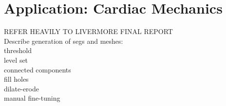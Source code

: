 \chapter{Application: Cardiac Mechanics}
\label{chap:5}
%

REFER HEAVILY TO LIVERMORE FINAL REPORT \\
Describe generation of segs and meshes: \\
threshold \\
level set \\
connected components \\
fill holes \\
dilate-erode \\
manual fine-tuning \\

